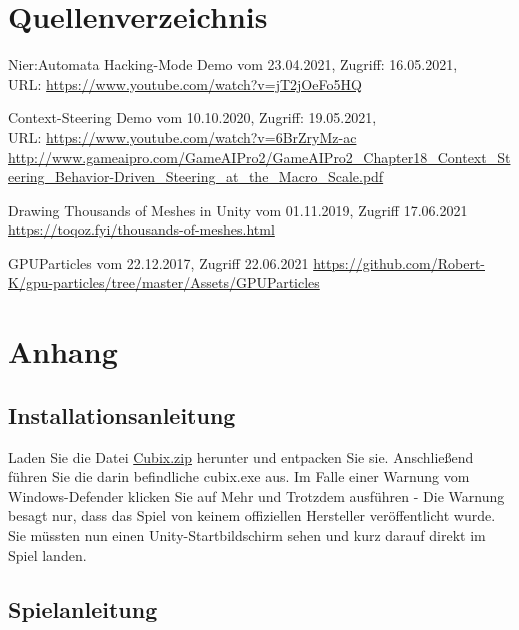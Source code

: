 \documentclass[a4paper,ngerman,12pt]{report}
\begin{document}
\chapter{Quellenverzeichnis}

\begin{thebibliography}{999}

 Nier:Automata Hacking-Mode Demo vom 23.04.2021,  Zugriff:  16.05.2021, \\ URL:
\url{https://www.youtube.com/watch?v=jT2jOeFo5HQ}

 Context-Steering Demo vom 10.10.2020,  Zugriff:  19.05.2021, \\ URL:
\url{https://www.youtube.com/watch?v=6BrZryMz-ac}
\url{http://www.gameaipro.com/GameAIPro2/GameAIPro2_Chapter18_Context_Steering_Behavior-Driven_Steering_at_the_Macro_Scale.pdf}

 Drawing Thousands of Meshes in Unity vom 01.11.2019, Zugriff 17.06.2021
\url{https://toqoz.fyi/thousands-of-meshes.html}

 GPUParticles vom 22.12.2017, Zugriff 22.06.2021
\url{https://github.com/Robert-K/gpu-particles/tree/master/Assets/GPUParticles}

\end{thebibliography}





\newpage
\newpage
\chapter{Anhang}




\section{Installationsanleitung}

Laden Sie die Datei \href{https://www.dropbox.com/s/g82vexjznq1x9dd/Cubix.zip?dl=1}{Cubix.zip} herunter und entpacken Sie sie. Anschlie{\ss}end führen Sie die darin befindliche cubix.exe aus.
Im Falle einer Warnung vom Windows-Defender klicken Sie auf Mehr und Trotzdem ausführen - Die Warnung besagt nur, dass das Spiel von keinem offiziellen Hersteller veröffentlicht wurde.
Sie müssten nun einen Unity-Startbildschirm sehen und kurz darauf direkt im Spiel landen.




\section{Spielanleitung}
\end{document}
